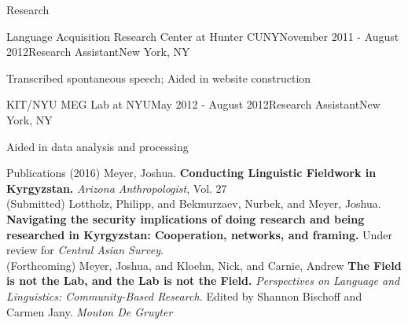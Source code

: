 \documentclass{resume} %
\begin{document}
\begin{rSection}{Research}
\begin{rSubsection}{Language Acquisition Research Center at Hunter CUNY}{November 2011 - August 2012}{Research Assistant}{New York, NY}
\item Transcribed spontaneous speech; Aided in website construction
\end{rSubsection}

\begin{rSubsection}{KIT/NYU MEG Lab at NYU}{May 2012 - August 2012}{Research Assistant}{New York, NY}
\item Aided in data analysis and processing
\end{rSubsection}


\end{rSection}




\vspace{.25cm}

\begin{rSection}{Publications}
{(2016)} {Meyer, Joshua.} {\bf Conducting Linguistic Fieldwork in Kyrgyzstan.} {\textit{Arizona Anthropologist}, Vol. 27} \\

{(Submitted)} {Lottholz, Philipp, and Bekmurzaev, Nurbek, and Meyer, Joshua.} {\textbf{Navigating the security implications of doing research and being researched in Kyrgyzstan: Cooperation, networks, and framing.}} {Under review for \textit{Central Asian Survey}.}\\

{(Forthcoming)} {Meyer, Joshua, and Kloehn, Nick, and Carnie, Andrew} {\bf The Field is not the Lab, and the Lab is not the Field.} {\it Perspectives on Language and Linguistics: Community-Based Research.} {Edited by Shannon Bischoff and Carmen Jany.} {\textit{Mouton De Gruyter}} \\

\end{rSection}
\end{document}
